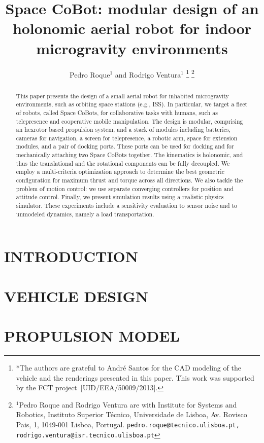\documentclass[letterpaper, 10 pt, conference]{ieeeconf}  %
\title{\LARGE \bf
  Space CoBot: modular design of an holonomic aerial robot for indoor microgravity environments
}
\author{Pedro Roque$^{1}$ and Rodrigo Ventura$^{1}$%
\thanks{*The authors are grateful to André Santos for the CAD modeling of the
vehicle and the renderings presented in this paper. This work was
supported by the FCT project~[UID/EEA/50009/2013].}%
\thanks{$^{1}$Pedro Roque and Rodrigo Ventura are with Institute for Systems and Robotics, Instituto Superior Técnico, Universidade de Lisboa, Av. Rovisco Pais, 1, 1049-001 Lisboa, Portugal.
        {\tt\small pedro.roque@tecnico.ulisboa.pt, rodrigo.ventura@isr.tecnico.ulisboa.pt}}%
}
\begin{document}
\maketitle
\thispagestyle{empty}
\pagestyle{empty}

\begin{abstract}

  This paper presents the design of a small aerial robot for inhabited
  microgravity environments, such as orbiting space stations (e.g.,
  ISS). In particular, we target a fleet of robots, called Space
  CoBots, for collaborative tasks with humans, such as telepresence
  and cooperative mobile manipulation. The design is modular,
  comprising an hexrotor based propulsion system, and a stack of
  modules including batteries, cameras for navigation, a screen for
  telepresence, a robotic arm, space for extension modules, and a pair
  of docking ports. These ports can be used for docking and for
  mechanically attaching two Space CoBots together. The kinematics is
  holonomic, and thus the translational and the rotational components
  can be fully decoupled. We employ a multi-criteria optimization
  approach to determine the best geometric configuration for maximum
  thrust and torque across all directions. We also tackle the problem
  of motion control: we use separate converging controllers for
  position and attitude control. Finally, we present simulation
  results using a realistic physics simulator. These experiments
  include a sensitivity evaluation to sensor noise and to unmodeled
  dynamics, namely a load transportation.

\end{abstract}


\section{INTRODUCTION}
\label{sec:introduction}


\section{VEHICLE DESIGN}
\label{sec:vehicle-design}


\section{PROPULSION MODEL}
\label{sec:propulsion}

\end{document}
